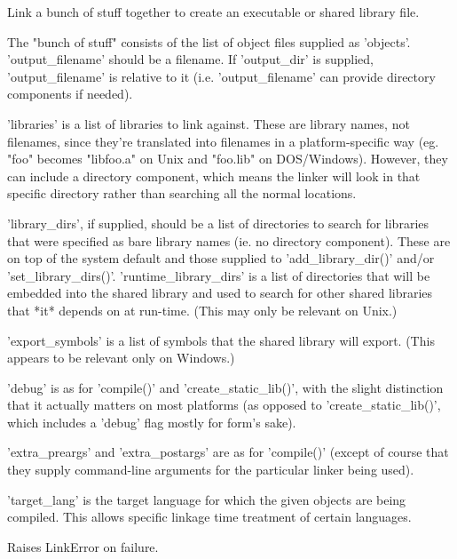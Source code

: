 \begin{DoxyVerb}Link a bunch of stuff together to create an executable or
shared library file.

The "bunch of stuff" consists of the list of object files supplied
as 'objects'.  'output_filename' should be a filename.  If
'output_dir' is supplied, 'output_filename' is relative to it
(i.e. 'output_filename' can provide directory components if
needed).

'libraries' is a list of libraries to link against.  These are
library names, not filenames, since they're translated into
filenames in a platform-specific way (eg. "foo" becomes "libfoo.a"
on Unix and "foo.lib" on DOS/Windows).  However, they can include a
directory component, which means the linker will look in that
specific directory rather than searching all the normal locations.

'library_dirs', if supplied, should be a list of directories to
search for libraries that were specified as bare library names
(ie. no directory component).  These are on top of the system
default and those supplied to 'add_library_dir()' and/or
'set_library_dirs()'.  'runtime_library_dirs' is a list of
directories that will be embedded into the shared library and used
to search for other shared libraries that *it* depends on at
run-time.  (This may only be relevant on Unix.)

'export_symbols' is a list of symbols that the shared library will
export.  (This appears to be relevant only on Windows.)

'debug' is as for 'compile()' and 'create_static_lib()', with the
slight distinction that it actually matters on most platforms (as
opposed to 'create_static_lib()', which includes a 'debug' flag
mostly for form's sake).

'extra_preargs' and 'extra_postargs' are as for 'compile()' (except
of course that they supply command-line arguments for the
particular linker being used).

'target_lang' is the target language for which the given objects
are being compiled. This allows specific linkage time treatment of
certain languages.

Raises LinkError on failure.
\end{DoxyVerb}
 \mbox{\label{classsetuptools_1_1__distutils_1_1ccompiler_1_1CCompiler_a25e501b1067f2710492dfba285ce363f}} 
